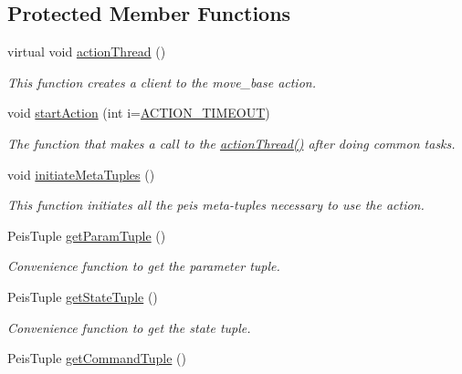 \subsection*{\-Protected \-Member \-Functions}
\begin{DoxyCompactItemize}
\item 
virtual void \hyperlink{classexekutor_1_1MoveToExekutor_ab3955fecc18a8b7d79b58813ff808467}{action\-Thread} ()
\begin{DoxyCompactList}\small\item\em \-This function creates a client to the move\-\_\-base action. \end{DoxyCompactList}\item 
void \hyperlink{classexekutor_1_1ActionExekutor_ab654dafa7b307003c35124509e3d8505}{start\-Action} (int i=\hyperlink{action__exekutor_8h_a5b040d9757224739efa101219b820edc}{\-A\-C\-T\-I\-O\-N\-\_\-\-T\-I\-M\-E\-O\-U\-T})
\begin{DoxyCompactList}\small\item\em \-The function that makes a call to the \hyperlink{classexekutor_1_1ActionExekutor_ab80a1327f11113222157cfec0abd9e9b}{action\-Thread()} after doing common tasks. \end{DoxyCompactList}\item 
void \hyperlink{classexekutor_1_1ActionExekutor_ae2f81a4994766a040bf6fa1cf36fbfb5}{initiate\-Meta\-Tuples} ()
\begin{DoxyCompactList}\small\item\em \-This function initiates all the peis meta-\/tuples necessary to use the action. \end{DoxyCompactList}\item 
\-Peis\-Tuple \hyperlink{classexekutor_1_1ActionExekutor_ac1e62ad386692ab2cd7e8ae2173f1eb5}{get\-Param\-Tuple} ()
\begin{DoxyCompactList}\small\item\em \-Convenience function to get the parameter tuple. \end{DoxyCompactList}\item 
\-Peis\-Tuple \hyperlink{classexekutor_1_1ActionExekutor_aad1e82b7d1c173dd1c8f81967d7374b3}{get\-State\-Tuple} ()
\begin{DoxyCompactList}\small\item\em \-Convenience function to get the state tuple. \end{DoxyCompactList}\item 
\-Peis\-Tuple \hyperlink{classexekutor_1_1ActionExekutor_a1c1f3fdb9bd439a014fa3af470eb250a}{get\-Command\-Tuple} ()

\end{DoxyCompactItemize}
